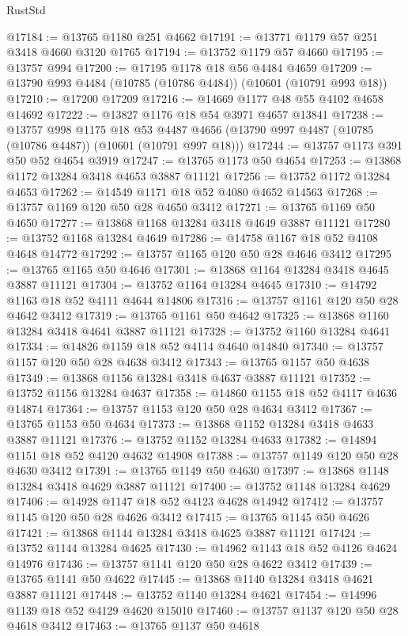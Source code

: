 \begin{lexlean}{RustStd}
\begin{coremodule}
@17184 := @13765 @1180 @251 @4662
@17191 := @13771 @1179 @57 @251 @3418 @4660 @3120 @1765
@17194 := @13752 @1179 @57 @4660
@17195 := @13757 @994
@17200 := @17195 @1178 @18 @56 @4484 @4659
@17209 := @13790 @993 @4484 (@10785 (@10786 @4484)) (@10601 (@10791 @993 @18))
@17210 := @17200 @17209
@17216 := @14669 @1177 @48 @55 @4102 @4658 @14692
@17222 := @13827 @1176 @18 @54 @3971 @4657 @13841
@17238 := @13757
    @998
    @1175
    @18
    @53
    @4487
    @4656
    (@13790 @997 @4487 (@10785 (@10786 @4487)) (@10601 (@10791 @997 @18)))
@17244 := @13757 @1173 @391 @50 @52 @4654 @3919
@17247 := @13765 @1173 @50 @4654
@17253 := @13868 @1172 @13284 @3418 @4653 @3887 @11121
@17256 := @13752 @1172 @13284 @4653
@17262 := @14549 @1171 @18 @52 @4080 @4652 @14563
@17268 := @13757 @1169 @120 @50 @28 @4650 @3412
@17271 := @13765 @1169 @50 @4650
@17277 := @13868 @1168 @13284 @3418 @4649 @3887 @11121
@17280 := @13752 @1168 @13284 @4649
@17286 := @14758 @1167 @18 @52 @4108 @4648 @14772
@17292 := @13757 @1165 @120 @50 @28 @4646 @3412
@17295 := @13765 @1165 @50 @4646
@17301 := @13868 @1164 @13284 @3418 @4645 @3887 @11121
@17304 := @13752 @1164 @13284 @4645
@17310 := @14792 @1163 @18 @52 @4111 @4644 @14806
@17316 := @13757 @1161 @120 @50 @28 @4642 @3412
@17319 := @13765 @1161 @50 @4642
@17325 := @13868 @1160 @13284 @3418 @4641 @3887 @11121
@17328 := @13752 @1160 @13284 @4641
@17334 := @14826 @1159 @18 @52 @4114 @4640 @14840
@17340 := @13757 @1157 @120 @50 @28 @4638 @3412
@17343 := @13765 @1157 @50 @4638
@17349 := @13868 @1156 @13284 @3418 @4637 @3887 @11121
@17352 := @13752 @1156 @13284 @4637
@17358 := @14860 @1155 @18 @52 @4117 @4636 @14874
@17364 := @13757 @1153 @120 @50 @28 @4634 @3412
@17367 := @13765 @1153 @50 @4634
@17373 := @13868 @1152 @13284 @3418 @4633 @3887 @11121
@17376 := @13752 @1152 @13284 @4633
@17382 := @14894 @1151 @18 @52 @4120 @4632 @14908
@17388 := @13757 @1149 @120 @50 @28 @4630 @3412
@17391 := @13765 @1149 @50 @4630
@17397 := @13868 @1148 @13284 @3418 @4629 @3887 @11121
@17400 := @13752 @1148 @13284 @4629
@17406 := @14928 @1147 @18 @52 @4123 @4628 @14942
@17412 := @13757 @1145 @120 @50 @28 @4626 @3412
@17415 := @13765 @1145 @50 @4626
@17421 := @13868 @1144 @13284 @3418 @4625 @3887 @11121
@17424 := @13752 @1144 @13284 @4625
@17430 := @14962 @1143 @18 @52 @4126 @4624 @14976
@17436 := @13757 @1141 @120 @50 @28 @4622 @3412
@17439 := @13765 @1141 @50 @4622
@17445 := @13868 @1140 @13284 @3418 @4621 @3887 @11121
@17448 := @13752 @1140 @13284 @4621
@17454 := @14996 @1139 @18 @52 @4129 @4620 @15010
@17460 := @13757 @1137 @120 @50 @28 @4618 @3412
@17463 := @13765 @1137 @50 @4618

\end{coremodule}
\end{lexlean}
